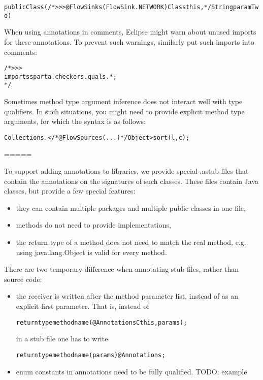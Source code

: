 \begin{alltt}
	public Class(/*>>> @FlowSinks(FlowSink.NETWORK) Class this, */ String paramTwo) {}
\end{alltt}

When using annotations in comments, Eclipse might warn about unused
imports for these annotations. To prevent such warnings, similarly put
such imports into comments:

\begin{alltt}
/*>>>
imports sparta.checkers.quals.*;
*/
\end{alltt}

Sometimes method type argument inference does not interact well with
type qualifiers. In such situations, you might need to provide
explicit method type arguments, for which the syntax is as follows:

\begin{alltt}
	Collections.</*@FlowSources({...})*/ Object>sort(l, c);
\end{alltt}

=====

To support adding annotations to libraries, we provide special .astub
files that contain the annotations on the signatures of such classes.
These files contain Java classes, but provide a few special features:
\begin{itemize}
\item they can contain multiple packages and multiple public classes in
 one file,
\item methods do not need to provide implementations,
\item the return type of a method does not need to match the real method,
 e.g. using java.lang.Object is valid for every method.
\end{itemize}

There are two temporary difference when annotating stub files, rather
than source code:
\begin{itemize}
\item the receiver is written after the method parameter list, instead of
as an explicit first parameter.
That is, instead of

\begin{alltt}
     returntype methodname(@Annotations C this, params);
\end{alltt}

in a stub file one has to write

\begin{alltt}
     returntype methodname(params) @Annotations;
\end{alltt}

\item enum constants in annotations need to be fully qualified. TODO: example
\end{itemize}


